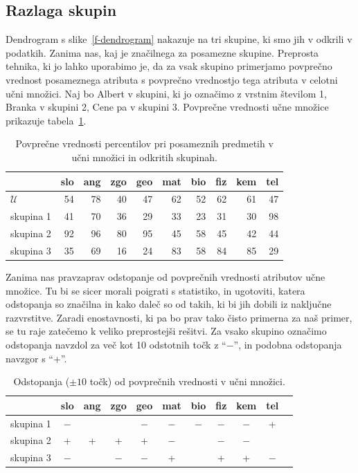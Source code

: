 \subsection{Razlaga skupin}

Dendrogram s slike~\ref{f-dendrogram} nakazuje na tri skupine, ki smo
jih v odkrili v podatkih. Zanima nas, kaj je značilnega za posamezne
skupine. Preprosta tehnika, ki jo lahko uporabimo je, da za vsak
skupino primerjamo povprečno
vrednost posameznega atributa s povprečno vrednostjo tega atributa v
celotni učni množici. Naj bo Albert v skupini, ki jo označimo z
vrstnim številom 1, Branka v skupini 2, Cene pa v skupini 3. Povprečne
vrednosti učne množice prikazuje tabela~\ref{f-povp-skupin}.

\begin{table}[htbp]
\caption{Povprečne vrednosti percentilov pri posameznih predmetih v
  učni množici in odkritih skupinah.}
\label{f-povp-skupin}
\begin{center}
\begin{tabular}{lrrrrrrrrr}
\toprule
 & slo & ang & zgo & geo & mat & bio & fiz & kem & tel \\
\midrule
$\mathcal{U}$ & 54 & 78 & 40 & 47 & 62 & 52 & 62 & 61 & 47 \\
skupina 1 & 41 & 70 & 36 & 29 & 33 & 23 & 31 & 30 & 98 \\
skupina 2 & 92 & 96 & 80 & 95 & 45 & 58 & 45 & 42 & 44 \\
skupina 3 & 35 & 69 & 16 & 24 & 83 & 58 & 84 & 85 & 29 \\
\bottomrule
\end{tabular}
\end{center}
\end{table}

Zanima nas pravzaprav odstopanje od povprečnih vrednosti atributov
učne množice. Tu bi se sicer morali poigrati s statistiko, in
ugotoviti, katera odstopanja so značilna in kako daleč so od takih, ki
bi jih dobili iz naključne razvrstitve. Zaradi enostavnosti, ki pa bo
prav tako čisto primerna za naš primer, se tu raje zatečemo
k veliko preprostejši rešitvi. Za vsako skupino označimo odstopanja
navzdol za več kot 10 odstotnih točk z ``$-$'', in podobna odstopanja
navzgor s ``+''. 

\begin{table}[htbp]
\caption{Odstopanja ($\pm 10$ točk) od povprečnih vrednosti v učni množici.}
\label{f-odstopanja-skupin}
\begin{center}
\begin{tabular}{lcccccccccc}
\toprule
 & slo & ang & zgo & geo & mat & bio & fiz & kem & tel \\
\midrule
skupina 1 & $-$ &  &  & $-$ & $-$ & $-$ & $-$ & $-$ & + \\
skupina 2 & + & + & + & + & $-$ &  & $-$ & $-$ &  \\
skupina 3 & $-$ &  & $-$ & $-$ & + &  & + & + & $-$ \\
\bottomrule
\end{tabular}
\end{center}
\end{table}

